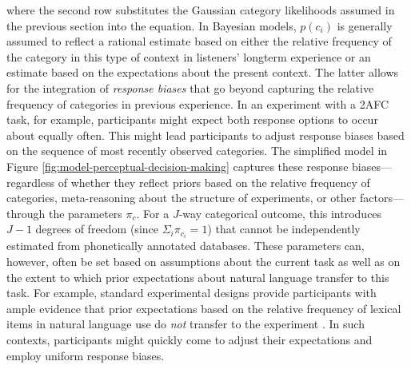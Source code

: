 \documentclass[
  11pt,
  man,floatsintext]{apa6}
\begin{document}
where the second row substitutes the Gaussian category likelihoods assumed in the previous section into the equation. In Bayesian models, \(p(c_i)\) is generally assumed to reflect a rational estimate based on either the relative frequency of the category in this type of context in listeners' longterm experience or an estimate based on the expectations about the present context. The latter allows for the integration of \emph{response biases} that go beyond capturing the relative frequency of categories in previous experience. In an experiment with a 2AFC task, for example, participants might expect both response options to occur about equally often. This might lead participants to adjust response biases based on the sequence of most recently observed categories. The simplified model in Figure \ref{fig:model-perceptual-decision-making} captures these response biases---regardless of whether they reflect priors based on the relative frequency of categories, meta-reasoning about the structure of experiments, or other factors---through the parameters \(\pi_{c}\). For a \(J\)-way categorical outcome, this introduces \(J-1\) degrees of freedom (since \(\Sigma_i \pi_{c_i} = 1\)) that cannot be independently estimated from phonetically annotated databases. These parameters can, however, often be set based on assumptions about the current task as well as on the extent to which prior expectations about natural language transfer to this task. For example, standard experimental designs provide participants with ample evidence that prior expectations based on the relative frequency of lexical items in natural language use do \emph{not} transfer to the experiment \autocite[cf.][]{jaeger2010}. In such contexts, participants might quickly come to adjust their expectations and employ uniform response biases.
\end{document}
